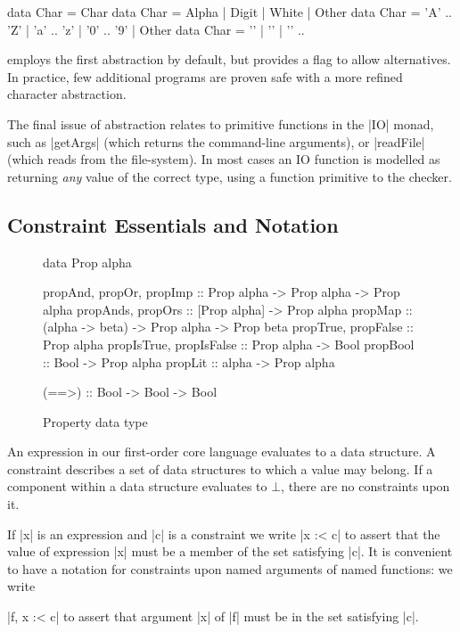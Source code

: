 \ignore\begin{code}
data Char = Char
data Char = Alpha | Digit | White | Other
data Char = 'A' .. 'Z' | 'a' .. 'z' | '0' .. '9' | Other
data Char = '\0' | '\1' | '\2' ..
\end{code}

\noindent \catch{} employs the first abstraction by default, but provides a flag to allow alternatives. In practice, few additional programs are proven safe with a more refined character abstraction.

The final issue of abstraction relates to primitive functions in the |IO| monad, such as |getArgs| (which returns the command-line arguments), or |readFile| (which reads from the file-system). In most cases an IO function is modelled as returning \textit{any} value of the correct type, using a function primitive to the checker.

\subsection{Constraint Essentials and Notation}
\label{sec:constraints}

\begin{figure}
\begin{code}
data Prop alpha

propAnd, propOr, propImp  :: Prop alpha -> Prop alpha -> Prop alpha
propAnds, propOrs         :: [Prop alpha] -> Prop alpha
propMap                   :: (alpha -> beta) -> Prop alpha -> Prop beta
propTrue, propFalse       :: Prop alpha
propIsTrue, propIsFalse   :: Prop alpha -> Bool
propBool                  :: Bool -> Prop alpha
propLit                   :: alpha -> Prop alpha

(==>) :: Bool -> Bool -> Bool
\end{code}
\caption{Property data type}
\label{fig:prop}
\end{figure}

An expression in our first-order core language evaluates to a data structure. A constraint describes a set of data structures to which a value may belong. If a component within a data structure evaluates to $\bot{}$, there are no constraints upon it.

If |x| is an expression and |c| is a constraint we write |x :< c| to assert that the value of expression |x| must be a member of the set satisfying |c|. It is convenient to have a notation for constraints upon named arguments of named functions: we write \ignore|f, x :< c| to assert that argument |x| of |f| must be in the set satisfying |c|.

